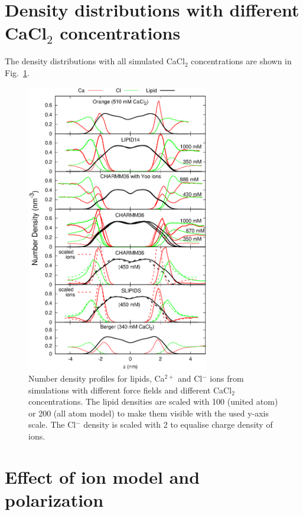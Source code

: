 \documentclass[twoside,twocolumn,9pt]{article}
\begin{document}
\section{Density distributions with different CaCl$_2$ concentrations}

The density distributions with all simulated CaCl$_2$ concentrations are shown in Fig.~\ref{CAdensities}.
\begin{figure}[t]
  \centering
  \includegraphics[width=8cm]{../Fig/CAdensities.eps}
  \caption{\label{CAdensities}
    Number density profiles for lipids, Ca$^{2+}$ and Cl$^-$ ions from simulations with different force fields 
    and different CaCl$_2$ concentrations. 
    The lipid densities are scaled with 100 (united atom) or 200 (all atom model) to make them visible with the used y-axis scale.
    The Cl$^-$ density is scaled with 2 to equalise charge density of ions.
  }
\end{figure}

\section{Effect of ion model and polarization}
\end{document}
